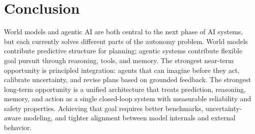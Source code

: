 \documentclass[conference]{IEEEtran}
\begin{document}
\section{Conclusion}
World models and agentic AI are both central to the next phase of AI systems, but each currently solves different parts of the autonomy problem. World models contribute predictive structure for planning; agentic systems contribute flexible goal pursuit through reasoning, tools, and memory. The strongest near-term opportunity is principled integration: agents that can imagine before they act, calibrate uncertainty, and revise plans based on grounded feedback. The strongest long-term opportunity is a unified architecture that treats prediction, reasoning, memory, and action as a single closed-loop system with measurable reliability and safety properties. Achieving that goal requires better benchmarks, uncertainty-aware modeling, and tighter alignment between model internals and external behavior.



\end{document}
